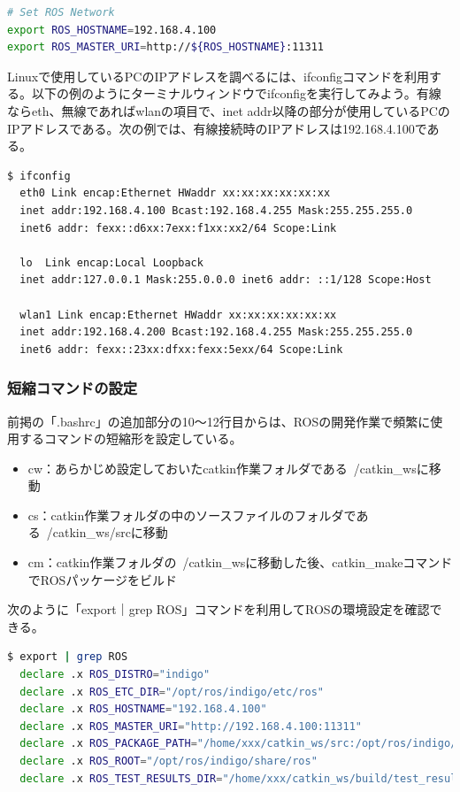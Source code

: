 \begin{lstlisting}[language=bash]
# Set ROS Network
export ROS_HOSTNAME=192.168.4.100
export ROS_MASTER_URI=http://${ROS_HOSTNAME}:11311
\end{lstlisting}

\begin{exercise}[ifconfig]
  Linuxで使用しているPCのIPアドレスを調べるには、ifconfigコマンドを利用する。以下の例のようにターミナルウィンドウでifconfigを実行してみよう。有線ならeth、無線であればwlanの項目で、inet addr以降の部分が使用しているPCのIPアドレスである。次の例では、有線接続時のIPアドレスは192.168.4.100である。
  \begin{lstlisting}[language=ROS, backgroundcolor=\color{ocre!10}, numbers=none]
  $ ifconfig
  eth0 Link encap:Ethernet HWaddr xx:xx:xx:xx:xx:xx
  inet addr:192.168.4.100 Bcast:192.168.4.255 Mask:255.255.255.0
  inet6 addr: fexx::d6xx:7exx:f1xx:xx2/64 Scope:Link

  lo  Link encap:Local Loopback
  inet addr:127.0.0.1 Mask:255.0.0.0 inet6 addr: ::1/128 Scope:Host

  wlan1 Link encap:Ethernet HWaddr xx:xx:xx:xx:xx:xx
  inet addr:192.168.4.200 Bcast:192.168.4.255 Mask:255.255.255.0
  inet6 addr: fexx::23xx:dfxx:fexx:5exx/64 Scope:Link
  \end{lstlisting}
\end{exercise}

\subsubsection{短縮コマンドの設定}

前掲の「.bashrc」の追加部分の10～12行目からは、ROSの開発作業で頻繁に使用するコマンドの短縮形を設定している。

\begin{itemize}[leftmargin=*]
\item cw：あらかじめ設定しておいたcatkin作業フォルダである~/catkin\_wsに移動
\item cs：catkin作業フォルダの中のソースファイルのフォルダである~/catkin\_ws/srcに移動
\item cm：catkin作業フォルダの~/catkin\_wsに移動した後、catkin\_makeコマンドでROSパッケージをビルド
\end{itemize}

\begin{exercise}[ROSの環境設定を確認する方法]
  次のように「export｜grep ROS」コマンドを利用してROSの環境設定を確認できる。

  \begin{lstlisting}[language=bash]
  $ export | grep ROS
  declare .x ROS_DISTRO="indigo"
  declare .x ROS_ETC_DIR="/opt/ros/indigo/etc/ros"
  declare .x ROS_HOSTNAME="192.168.4.100"
  declare .x ROS_MASTER_URI="http://192.168.4.100:11311"
  declare .x ROS_PACKAGE_PATH="/home/xxx/catkin_ws/src:/opt/ros/indigo/share:/opt/ros/indigo/ stacks"
  declare .x ROS_ROOT="/opt/ros/indigo/share/ros"
  declare .x ROS_TEST_RESULTS_DIR="/home/xxx/catkin_ws/build/test_results"
  \end{lstlisting}
\end{exercise}



